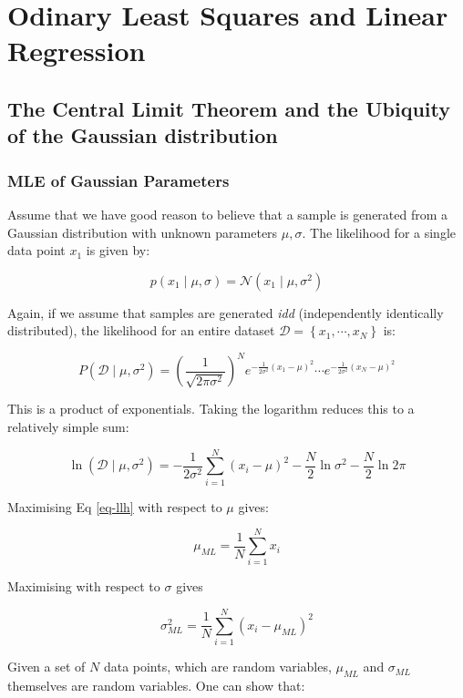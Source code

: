 \part{Odinary Least Squares and Linear Regression}

\chapter{The Central Limit Theorem and the Ubiquity of the Gaussian distribution}
\section{MLE of Gaussian Parameters}
Assume that we have good reason to believe that a sample is generated from a Gaussian distribution with unknown parameters $\mu, \sigma$.
The likelihood for a single data point $x_1$ is given by:

$$
p(x_1 \mid \mu, \sigma) = \mathcal{N}(x_1 \mid \mu, \sigma^2)
$$

Again, if we assume that samples are generated \emph{idd} (independently identically distributed), the likelihood for an entire dataset $\mathcal{D} = \left\{ x_1, \cdots, x_N \right\}$ is:

$$
P(\mathcal{D} \mid \mu, \sigma^2) = (\frac{1}{\sqrt{2 \pi \sigma^2}})^N e^{-\frac{1}{2 \sigma^2}(x_1 -\mu)^2} \cdots e^{-\frac{1}{2 \sigma^2}(x_N -\mu)^2}
$$

This is a product of exponentials. Taking the logarithm  reduces this to a relatively simple sum:

\begin{equation}
\ln (\mathcal{D} \mid \mu,\sigma^2) = -\frac{1}{2 \sigma^2}\sum^N_{i=1} (x_i - \mu)^2 - \frac{N}{2} \ln \sigma^2 - \frac{N}{2} \ln 2 \pi
\label{eq-llh}
\end{equation}

Maximising Eq \ref{eq-llh} with respect to $\mu$ gives:

\begin{equation}
\mu_{ML} = \frac{1}{N} \sum^N_{i=1} x_i
\end{equation}

Maximising with respect to $\sigma$ gives

\begin{equation}
\sigma^2_{ML} = \frac{1}{N} \sum^N_{i=1} (x_i - \mu_{ML})^2
\end{equation}


Given a set of $N$ data points, which are random variables, $\mu_{ML}$ and $\sigma_{ML}$ themselves are random variables.     One can show that:

